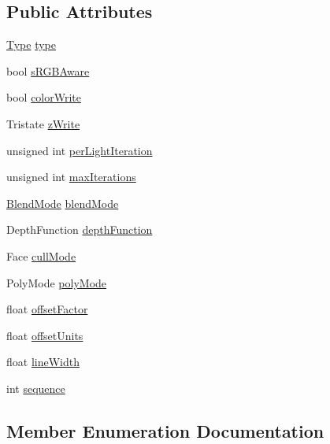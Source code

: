 \subsection*{Public Attributes}
\begin{DoxyCompactItemize}
\item 
\hyperlink{classTechnique_1_1Pass_a6dccd6c3a50d047d7d3556f475be8bfa}{Type} \hyperlink{classTechnique_1_1Pass_af4d52a4bcd170b00657634510280e37e}{type}
\item 
bool \hyperlink{classTechnique_1_1Pass_aeea18866a5394c4b0f8a10a356218d28}{s\+R\+G\+B\+Aware}
\item 
bool \hyperlink{classTechnique_1_1Pass_a3e71850801dfab821b904dd1069cb3f9}{color\+Write}
\item 
Tristate \hyperlink{classTechnique_1_1Pass_a126c6263084feceff39fa066aee64413}{z\+Write}
\item 
unsigned int \hyperlink{classTechnique_1_1Pass_ae3a7e3b070bf65db8c82a2089c9555b9}{per\+Light\+Iteration}
\item 
unsigned int \hyperlink{classTechnique_1_1Pass_ad7cde7699602c9b3b7e38e09b69cf8d0}{max\+Iterations}
\item 
\hyperlink{classTechnique_1_1Pass_a8ef329848acd3448aebbf46e0e50b2a8}{Blend\+Mode} \hyperlink{classTechnique_1_1Pass_a8ee535e18674a4fb16678238272447f5}{blend\+Mode}
\item 
Depth\+Function \hyperlink{classTechnique_1_1Pass_ae6c3934149bfb4d791fda507900644c4}{depth\+Function}
\item 
Face \hyperlink{classTechnique_1_1Pass_a8732559ebb9bac891dee8bf918637863}{cull\+Mode}
\item 
Poly\+Mode \hyperlink{classTechnique_1_1Pass_ae7db258ed161fbe892392a069451db12}{poly\+Mode}
\item 
float \hyperlink{classTechnique_1_1Pass_a5f08dce49dd118dde86aa84c8421e803}{offset\+Factor}
\item 
float \hyperlink{classTechnique_1_1Pass_a27e27ff105ea013847fa76a0efab9791}{offset\+Units}
\item 
float \hyperlink{classTechnique_1_1Pass_aa21efec562ec689f362befc6e2c988df}{line\+Width}
\item 
int \hyperlink{classTechnique_1_1Pass_a4fb8583c7e17e7471e41307846c5a4eb}{sequence}
\end{DoxyCompactItemize}


\subsection{Member Enumeration Documentation}
